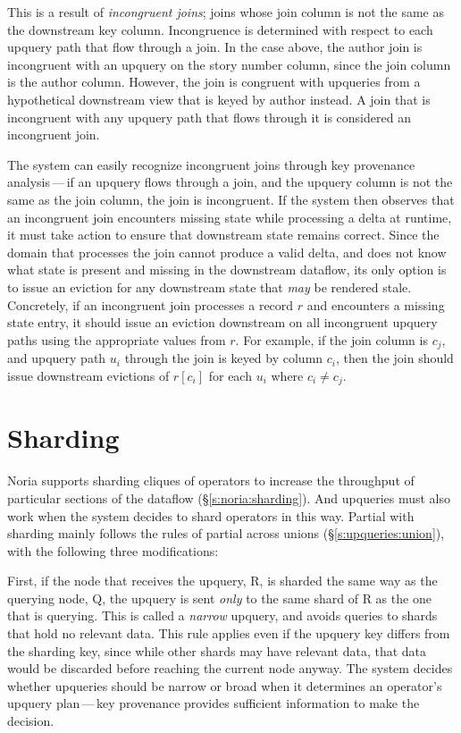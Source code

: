 This is a result of \textit{incongruent joins}; joins whose join column is not
the same as the downstream key column. Incongruence is determined with respect
to each upquery path that flow through a join. In the case above, the author
join is incongruent with an upquery on the story number column, since the join
column is the author column. However, the join is congruent with upqueries from
a hypothetical downstream view that is keyed by author instead. A join that is
incongruent with any upquery path that flows through it is considered an
incongruent join.

The system can easily recognize incongruent joins through key provenance
analysis\,---\,if an upquery flows through a join, and the upquery column is not
the same as the join column, the join is incongruent. If the system then
observes that an incongruent join encounters missing state while processing a
delta at runtime, it must take action to ensure that downstream state remains
correct. Since the domain that processes the join cannot produce a valid delta,
and does not know what state is present and missing in the downstream dataflow,
its only option is to issue an eviction for any downstream state that \emph{may}
be rendered stale. Concretely, if an incongruent join processes a record $r$ and
encounters a missing state entry, it should issue an eviction downstream on all
incongruent upquery paths using the appropriate values from $r$. For example, if
the join column is $c_j$, and upquery path $u_i$ through the join is keyed by
column $c_i$, then the join should issue downstream evictions of $r[c_i]$ for
each $u_i$ where $c_i \neq c_j$.

\section{Sharding}

Noria supports sharding cliques of operators to increase the throughput
of particular sections of the dataflow (\S\ref{s:noria:sharding}). And upqueries
must also work when the system decides to shard operators in this way. Partial
with sharding mainly follows the rules of partial across unions
(\S\ref{s:upqueries:union}), with the following three modifications:

First, if the node that receives the upquery, R, is sharded the same way as the
querying node, Q, the upquery is sent \emph{only} to the same shard of R as the
one that is querying. This is called a \textit{narrow} upquery, and avoids
queries to shards that hold no relevant data. This rule applies even if the
upquery key differs from the sharding key, since while other shards may have
relevant data, that data would be discarded before reaching the current node
anyway. The system decides whether upqueries should be narrow or broad when it
determines an operator's upquery plan\,---\,key provenance provides sufficient
information to make the decision.

